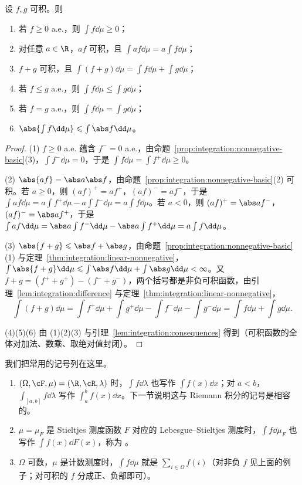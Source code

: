 \begin{theorem}\label{thm:integration:integrable}
设 $f,g$ 可积。则
\begin{enumerate}
\item 若 $f\geqslant0$ a.e.，则 $\int f\dd\mu\geqslant0$；
\item 对任意 $a\in\R$，$af$ 可积，且 $\int af\dd\mu=a\int f\dd\mu$；
\item $f+g$ 可积，且 $\int(f+g)\dd\mu=\int f\dd\mu+\int g\dd\mu$；
\item 若 $f\leqslant g$ a.e.，则 $\int f\dd\mu\leqslant\int g\dd\mu$；
\item 若 $f=g$ a.e.，则 $\int f\dd\mu=\int g\dd\mu$；
\item $\abs{\int f\dd\mu}\leqslant\int\abs f\dd\mu$。
\end{enumerate}
\end{theorem}
\begin{proof}
(1) $f\geqslant0$ a.e. 蕴含 $f^-=0$ a.e.，由命题~\ref{prop:integration:nonnegative-basic}(3)，$\int f^-\dd\mu=0$，于是 $\int f\dd\mu=\int f^+\dd\mu\geqslant0$。

(2) $\abs{af}=\abs a\abs f$，由命题~\ref{prop:integration:nonnegative-basic}(2) 可积。若 $a\geqslant0$，则 $(af)^+=af^+$，$(af)^-=af^-$，于是 $\int af\dd\mu=a\int f^+\dd\mu-a\int f^-\dd\mu=a\int f\dd\mu$。若 $a<0$，则 $(af)^+=\abs af^-$，$(af)^-=\abs af^+$，于是 $\int af\dd\mu=\abs a\int f^-\dd\mu-\abs a\int f^+\dd\mu=a\int f\dd\mu$。

(3) $\abs{f+g}\leqslant\abs f+\abs g$，由命题~\ref{prop:integration:nonnegative-basic}(1) 与定理~\ref{thm:integration:linear-nonnegative}，$\int\abs{f+g}\dd\mu\leqslant\int\abs f\dd\mu+\int\abs g\dd\mu<\infty$。又 $f+g=(f^++g^+)-(f^-+g^-)$，两个括号都是非负可积函数，由引理~\ref{lem:integration:difference} 与定理~\ref{thm:integration:linear-nonnegative}，
\[
\int(f+g)\dd\mu=\int f^+\dd\mu+\int g^+\dd\mu-\int f^-\dd\mu-\int g^-\dd\mu=\int f\dd\mu+\int g\dd\mu .
\]

(4)(5)(6) 由 (1)(2)(3) 与引理~\ref{lem:integration:consequences} 得到（可积函数的全体对加法、数乘、取绝对值封闭）。
\end{proof}

我们把常用的记号列在这里。
\begin{enumerate}
\item $(\Omega,\cF,\mu)=(\R,\cR,\lambda)$ 时，$\int f\dd\lambda$ 也写作 $\int f(x)\dd x$；对 $a<b$，$\int_{[a,b]}f\dd\lambda$ 写作 $\int_a^bf(x)\dd x$。下一节说明这与 Riemann 积分的记号是相容的。
\item $\mu=\mu_F$ 是 Stieltjes 测度函数 $F$ 对应的 Lebesgue--Stieltjes 测度时，$\int f\dd\mu_F$ 也写作 $\int f(x)\dd F(x)$，称为 。
\item $\Omega$ 可数，$\mu$ 是计数测度时，$\int f\dd\mu$ 就是 $\sum_{i\in\Omega}f(i)$（对非负 $f$ 见上面的例子；对可积的 $f$ 分成正、负部即可）。
\end{enumerate}

